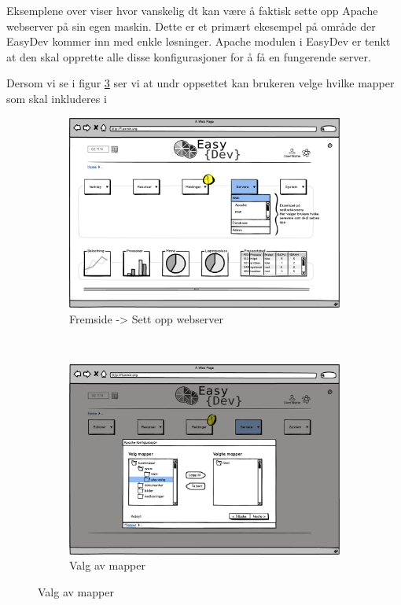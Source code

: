 Eksemplene over viser hvor vanskelig dt kan være å faktisk sette opp Apache webserver på sin egen maskin. Dette er et primært ekesempel på område der EasyDev kommer inn med enkle løsninger. Apache modulen i EasyDev er tenkt at den skal opprette alle disse konfigurasjoner for å få en fungerende server.

Dersom vi se i figur \ref{fig:apache2} ser vi at undr oppsettet kan brukeren velge hvilke mapper som skal inkluderes i 


\begin{figure}[p]
        \centering
        \begin{subfigure}[b]{0.48\textwidth}
                \includegraphics[width=\textwidth]
                {./img/prosessdokumentasjon/lowfi/apache1.png}
                \caption{Fremside -> Sett opp webserver}
                \label{fig:apache1}
        \end{subfigure}%
        ~ %
        \begin{subfigure}[b]{0.48\textwidth}
                \includegraphics[width=\textwidth]
                {./img/prosessdokumentasjon/lowfi/apache2.png}
                \caption{Valg av mapper}
                \label{fig:apache2}
        \end{subfigure}
       

\end{figure}
